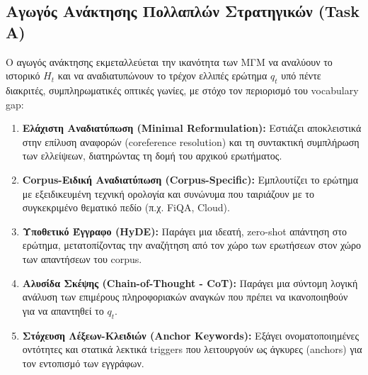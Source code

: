 \subsection{Αγωγός Ανάκτησης Πολλαπλών Στρατηγικών (Task A)}

Ο αγωγός ανάκτησης εκμεταλλεύεται την ικανότητα των ΜΓΜ να αναλύουν το ιστορικό $H_t$ και να αναδιατυπώνουν το τρέχον ελλιπές ερώτημα $q_t$ υπό πέντε διακριτές, συμπληρωματικές οπτικές γωνίες, με στόχο τον περιορισμό του vocabulary gap:
\begin{enumerate}
    \item \textbf{Ελάχιστη Αναδιατύπωση (Minimal Reformulation):} Εστιάζει αποκλειστικά στην επίλυση αναφορών (coreference resolution) και τη συντακτική συμπλήρωση των ελλείψεων, διατηρώντας τη δομή του αρχικού ερωτήματος.
    \item \textbf{Corpus-Ειδική Αναδιατύπωση (Corpus-Specific):} Εμπλουτίζει το ερώτημα με εξειδικευμένη τεχνική ορολογία και συνώνυμα που ταιριάζουν με το συγκεκριμένο θεματικό πεδίο (π.χ. FiQA, Cloud).
    \item \textbf{Υποθετικό Έγγραφο (HyDE):} Παράγει μια ιδεατή, zero-shot απάντηση στο ερώτημα, μετατοπίζοντας την αναζήτηση από τον χώρο των ερωτήσεων στον χώρο των απαντήσεων του corpus.
    \item \textbf{Αλυσίδα Σκέψης (Chain-of-Thought - CoT):} Παράγει μια σύντομη λογική ανάλυση των επιμέρους πληροφοριακών αναγκών που πρέπει να ικανοποιηθούν για να απαντηθεί το $q_t$.
    \item \textbf{Στόχευση Λέξεων-Κλειδιών (Anchor Keywords):} Εξάγει ονοματοποιημένες οντότητες και στατικά λεκτικά triggers που λειτουργούν ως άγκυρες (anchors) για τον εντοπισμό των εγγράφων.
\end{enumerate}

